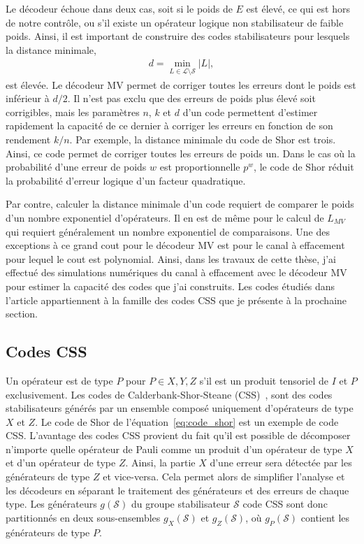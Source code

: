 Le décodeur échoue dans deux cas,
soit si le poids de $E$ est élevé, ce qui est hors de notre contrôle,
ou s'il existe un opérateur logique non stabilisateur de faible poids.
Ainsi,
il est important de construire des codes stabilisateurs pour lesquels la distance minimale,
\begin{align}
  d = \min_{L \in \mathcal L \setminus \mathcal S} |L|,
\end{align}
est élevée.
Le décodeur MV permet de corriger toutes les erreurs dont le poids est inférieur à $d / 2$.
Il n'est pas exclu que des erreurs de poids plus élevé soit corrigibles, 
mais les paramètres $n$, $k$ et $d$ d'un code permettent d'estimer rapidement la capacité
de ce dernier à corriger les erreurs en fonction de son rendement $k/n$.
Par exemple,
la distance minimale du code de Shor est trois.
Ainsi, ce code permet de corriger toutes les erreurs de poids un.
Dans le cas où la probabilité d'une erreur de poids $w$ est proportionnelle $p^w$,
le code de Shor réduit la probabilité d'erreur logique d'un facteur quadratique.

Par contre,
calculer la distance minimale d'un code requiert de comparer le poids d'un nombre exponentiel d'opérateurs.
Il en est de même pour le calcul de $L_{MV}$ qui requiert généralement un nombre exponentiel de comparaisons.
Une des exceptions à ce grand cout pour le décodeur MV est pour le canal à effacement pour lequel
le cout est  polynomial.
Ainsi, dans les travaux de cette thèse,
j'ai effectué des simulations numériques du canal à effacement avec le décodeur MV pour estimer la
capacité des codes que j'ai construits.
Les codes étudiés dans l'article appartiennent 
à la famille des codes CSS que je présente à la prochaine section.

\subsection{Codes CSS}

Un opérateur est de type $P$ pour $P \in {X, Y, Z}$ s'il est un produit tensoriel de $I$ et $P$ exclusivement.
Les codes de Calderbank-Shor-Steane (CSS)~\cite{calderbank_good_1996, steane_multiple-particle_nodate},
sont des codes stabilisateurs générés par un ensemble composé uniquement d'opérateurs de type $X$ et $Z$.
Le code de Shor de l'équation~\ref{eq:code_shor} est un exemple de code CSS.
L'avantage des codes CSS provient du fait qu'il est possible de décomposer n'importe quelle opérateur
de Pauli comme un produit d'un opérateur de type $X$ et d'un opérateur de type $Z$.
Ainsi,
la partie $X$ d'une erreur sera détectée par les générateurs de type $Z$ et vice-versa.
Cela permet alors de simplifier l'analyse et les décodeurs en séparant le traitement des générateurs 
et des erreurs de chaque type.
Les générateurs $g(\mathcal S)$ du groupe stabilisateur $\mathcal S$
code CSS sont donc partitionnés en deux sous-ensembles $g_X(\mathcal S)$ et $g_Z(\mathcal S)$,
où $g_P(\mathcal S)$ contient les générateurs de type $P$.


